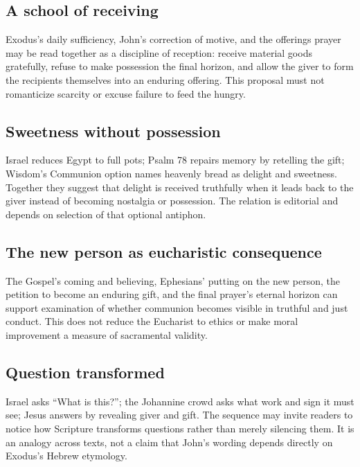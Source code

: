 \subsection*{A school of receiving}
Exodus's daily sufficiency, John's correction of motive, and the offerings
prayer may be read together as a discipline of reception: receive material
goods gratefully, refuse to make possession the final horizon, and allow the
giver to form the recipients themselves into an enduring offering. This
proposal must not romanticize scarcity
or excuse failure to feed the hungry.

\subsection*{Sweetness without possession}
Israel reduces Egypt to full pots; Psalm 78 repairs memory by retelling the
gift; Wisdom's Communion option names heavenly bread as delight and sweetness.
Together they suggest that delight is received truthfully when it leads back
to the giver instead of becoming nostalgia or possession. The relation is editorial and depends on selection of that optional antiphon.

\subsection*{The new person as eucharistic consequence}
The Gospel's coming and believing, Ephesians' putting on the new person, the
petition to become an enduring gift, and the final prayer's eternal horizon
can support examination of whether communion becomes visible in truthful and
just conduct. This does not reduce
the Eucharist to ethics or make moral improvement a measure of sacramental
validity.

\subsection*{Question transformed}
Israel asks ``What is this?''; the Johannine crowd asks what work and sign it
must see; Jesus answers by revealing giver and gift. The sequence may invite
readers to notice how Scripture transforms questions rather than merely
silencing them. It is an analogy across texts, not a claim that John's wording
depends directly on Exodus's Hebrew etymology.
